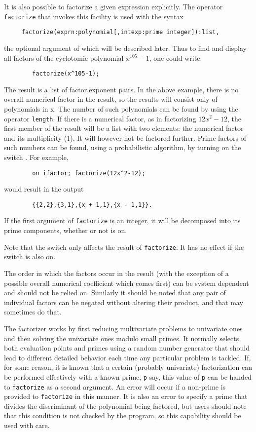 \hypertarget{operator:FACTORIZE}{}
It is also possible to factorize a given expression explicitly.  The
operator \texttt{factorize} that invokes this facility is
used with the syntax
\begin{verbatim}
     factorize(exprn:polynomial[,intexp:prime integer]):list,
\end{verbatim}
the optional argument of which will be described later. Thus to find and
display all factors of the cyclotomic polynomial $x^{105}-1$, one could
write:
\begin{verbatim}
        factorize(x^105-1);
\end{verbatim}
The result is a list of factor,exponent pairs.
In the above example, there is no overall numerical factor in the result,
so the results will consist only of polynomials in x.  The number of such
polynomials can be found by using the operator \texttt{length}.
If there is a numerical factor, as in factorizing $12x^{2}-12$,
the first member of the result will be a list with two elements: the numerical factor and its multiplicity (1).
It will however not be factored further.  Prime factors of such numbers
can be found, using a probabilistic algorithm, by turning on the switch
.  For example,
\begin{verbatim}
        on ifactor; factorize(12x^2-12);
\end{verbatim}
would result in the output
\begin{verbatim}
        {{2,2},{3,1},{x + 1,1},{x - 1,1}}.
\end{verbatim}

If the first argument of \texttt{factorize} is an integer, it will be
decomposed into its prime components, whether or not  is on.

Note that the  switch only affects the result of \texttt{factorize}.
It has no effect if the  switch is also on.

The order in which the factors occur in the result (with the exception of
a possible overall numerical coefficient which comes first) can be system
dependent and should not be relied on. Similarly it should be noted that
any pair of individual factors can be negated without altering their
product, and that {\REDUCE} may sometimes do that.

The factorizer works by first reducing multivariate problems to univariate
ones and then solving the univariate ones modulo small primes. It normally
selects both evaluation points and primes using a random number generator
that should lead to different detailed behavior each time any particular
problem is tackled. If, for some reason, it is known that a certain
(probably univariate) factorization can be performed effectively with a
known prime, \texttt{p} say, this value of \texttt{p} can be handed to
\texttt{factorize} as a second
argument. An error will occur if a non-prime is provided to \texttt{factorize} in
this manner. It is also an error to specify a prime that divides the
discriminant of the polynomial being factored, but users should note that
this condition is not checked by the program, so this capability should be
used with care.

